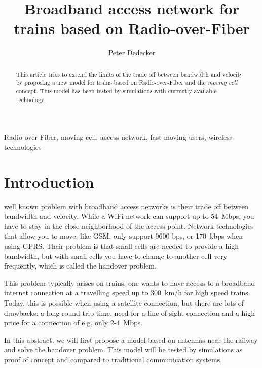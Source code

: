 \documentclass[twocolumn]{phdsymp} %
\begin{document}
\title{Broadband access network for trains based on Radio-over-Fiber} %

\author{Peter Dedecker}


\maketitle

\begin{abstract}
This article tries to extend the limits of the trade off between bandwidth and velocity by proposing a new model for trains based on Radio-over-Fiber and the \textit{moving cell} concept.  This model has been tested by simulations with currently available technology.
\end{abstract}

\begin{keywords}
Radio-over-Fiber, moving cell, access network, fast moving users, wireless technologies
\end{keywords}

\section{Introduction}
 well known problem with broadband access networks is their trade off between bandwidth and velocity.  While a WiFi-network can support up to 54~Mbps, you have to stay in the close neighborhood of the access point.  Network technologies that allow you to move, like GSM, only support 9600 bps, or 170~kbps when using GPRS.  Their problem is that small cells are needed to provide a high bandwidth, but with small cells you have to change to another cell very frequently, which is called the handover problem.

This problem typically arises on trains: one wants to have access to a broadband internet connection at a travelling speed up to 300~km/h for high speed trains.  Today, this is possible when using a satellite connection, but there are lots of drawbacks: a long round trip time, need for a line of sight connection and a high price for a connection of e.g. only 2-4~Mbps.

In this abstract, we will first propose a model based on antennas near the railway and solve the handover problem.  This model will be tested by simulations as proof of concept and compared to traditional communication systems.
\end{document}
